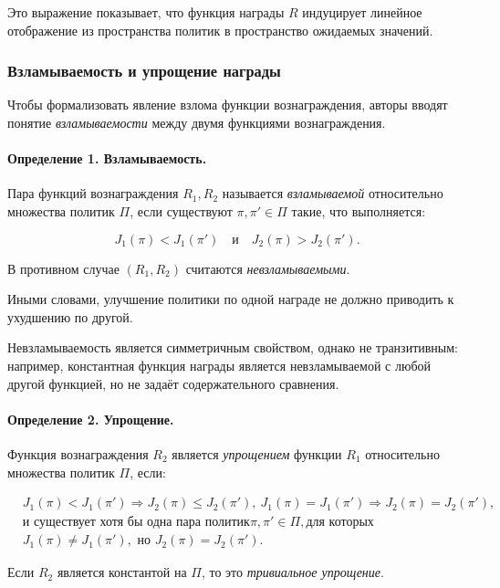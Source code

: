 Это выражение показывает, что функция награды $R$ индуцирует линейное отображение из пространства политик в пространство ожидаемых значений.


\subsubsection{Взламываемость и упрощение награды}

Чтобы формализовать явление взлома функции вознаграждения, авторы вводят понятие \emph{взламываемости} между двумя функциями вознаграждения.

\begin{definition}
\label{def:hackability}
\paragraph{Определение 1. Взламываемость.} Пара функций вознаграждения $R_1, R_2$ называется \emph{взламываемой} относительно множества политик $\Pi$,
если существуют $\pi, \pi' \in \Pi$ такие, что выполняется:

\begin{equation}
J_1(\pi) < J_1(\pi') \quad \text{и} \quad J_2(\pi) > J_2(\pi').
\end{equation}

В противном случае $(R_1, R_2)$ считаются \emph{невзламываемыми}.
\end{definition}

Иными словами, улучшение политики по одной награде не должно приводить к ухудшению по другой.

Невзламываемость является симметричным свойством, однако не транзитивным: например, константная функция награды является невзламываемой с любой другой функцией, но не задаёт содержательного сравнения.

\begin{definition}
\label{def:simplification}
\paragraph{Определение 2. Упрощение.} Функция вознаграждения $R_2$ является \emph{упрощением} функции $R_1$ относительно множества политик $\Pi$, если:

\begin{equation}
\begin{aligned}
&J_1(\pi) < J_1(\pi') \Rightarrow J_2(\pi) \le J_2(\pi'), \
J_1(\pi) = J_1(\pi') \Rightarrow J_2(\pi) = J_2(\pi'), \\
&\text{и существует хотя бы одна пара политик} \pi, \pi' \in \Pi, \text{для которых} \\
&J_1(\pi) \ne J_1(\pi'), \text{ но } J_2(\pi) = J_2(\pi').
\end{aligned}
\end{equation}

Если $R_2$ является константой на $\Pi$, то это \emph{тривиальное упрощение}.
\end{definition}


